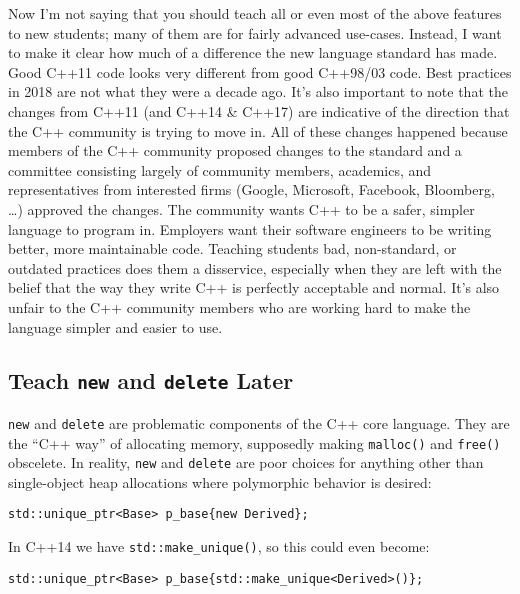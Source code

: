 \documentclass{article}
\newcommand{\CppNew}{\lstinline{new}}
\newcommand{\CppDelete}{\lstinline{delete}}
\begin{document}
Now I'm not saying that you should teach all or even most of the above features to new students; many of them are for fairly advanced use-cases.  Instead, I want to make it clear how much of a difference the new language standard has made.  Good C++11 code looks very different from good C++98/03 code.  Best practices in 2018 are not what they were a decade ago.  It's also important to note that the changes from C++11 (and C++14 \& C++17) are indicative of the direction that the C++ community is trying to move in.  All of these changes happened because members of the C++ community proposed changes to the standard and a committee consisting largely of community members, academics, and representatives from interested firms (Google, Microsoft, Facebook, Bloomberg, \ldots) approved the changes.  The community wants C++ to be a safer, simpler language to program in.  Employers want their software engineers to be writing better, more maintainable code.  Teaching students bad, non-standard, or outdated practices does them a disservice, especially when they are left with the belief that the way they write C++ is perfectly acceptable and normal.  It's also unfair to the C++ community members who are working hard to make the language simpler and easier to use.

\subsection*{Teach \CppNew{} and \CppDelete{} Later}
\CppNew{} and \CppDelete{} are problematic components of the C++ core language.  They are the ``C++ way'' of allocating memory, supposedly making \lstinline{malloc()} and \lstinline{free()} obscelete.  In reality, \CppNew{} and \CppDelete{} are poor choices for anything other than single-object heap allocations where polymorphic behavior is desired:
\begin{lstlisting}
std::unique_ptr<Base> p_base{new Derived};
\end{lstlisting}
In C++14 we have \lstinline{std::make_unique()}, so this could even become:
\begin{lstlisting}
std::unique_ptr<Base> p_base{std::make_unique<Derived>()};
\end{lstlisting}
\end{document}
